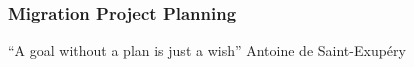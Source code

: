 \documentclass[xcolor=dvipsnames]{beamer}
\begin{document}
{
  \begin{frame}[plain]

    \frametitle{Migration Project Planning}

      \begin{flushright}
        \begin{LARGE}
          “A goal without a plan is just a wish”
          \newline
          \newline
          Antoine de Saint-Exupéry
        \end{LARGE}
      \end{flushright}
  \end{frame}
}
\end{document}
